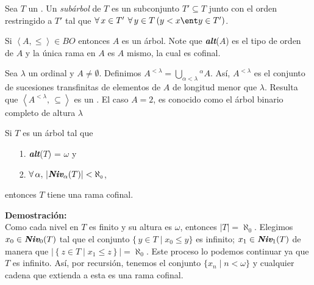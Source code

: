 \begin{definicion}
	Sea $T$ un \arbol. Un \textit{subárbol} de $T$ es un subconjunto $T'\subseteq T$ junto con el orden restringido a $T'$ tal que $\forall \, x\in T'\: \, \forall \, y\in T \left( y < x \ent y\in T'\right) $. 
\end{definicion} 


\begin{ejemplo}
	Si $\left\langle A, \leq \right\rangle \in BO$ entonces $A$ es un árbol. Note que \textit{\textbf{alt}}($A$) es el tipo de orden de $A$ y la única rama en $A$ es $A$ mismo, la cual es cofinal.  
\end{ejemplo} 

\begin{ejemplo}
	Sea $\lambda$ un ordinal y $A \neq \emptyset$. Definimos $A^{<\lambda} = \displaystyle \bigcup_{\alpha < \lambda} {^\alpha}A$. Así, $A^{<\lambda}$ es el conjunto de sucesiones transfinitas de elementos de $A$ de longitud menor que $\lambda$. Resulta que $\left\langle A^{<\lambda},\, \scriptstyle \subseteq \right\rangle$ es un \arbol. El caso $A = 2$, es conocido como el árbol binario completo de altura $\lambda$
\end{ejemplo}

\begin{teorema}
	Si $T$ es un árbol tal que
	\begin{itemize}
		\item[1.] \textit{\textbf{alt}}($T$) = $\omega$ y
		\item[2.] $\forall \, \alpha, \, |\textit{\textbf{Niv}}_{\alpha}(T)| < \aleph_{\scriptscriptstyle 0}$,
	\end{itemize}
	entonces $T$ tiene una rama cofinal. 	
\end{teorema}

\textbf{Demostración:}\\

Como cada nivel en $T$ es finito y su altura es $\omega$, entonces $|T| = \aleph_{\scriptscriptstyle 0}$. Elegimos $x_{0} \in \textit{\textbf{Niv}}_{0}(T)$ tal que el conjunto $\{ \,y\in T\mid x_{0} \leq y \}$ es infinito; $x_{1} \in \textit{\textbf{Niv}}_{1}(T)$ de manera que $|\left\lbrace z\in T \mid x_{1} \leq z \right\rbrace | = \aleph_{\scriptscriptstyle 0}$. Este proceso lo podemos continuar ya que $T$ es infinito. Así, por recursión, tenemos el conjunto $\{x_{n} \mid n < \omega\}$ y cualquier cadena que extienda a esta es una rama cofinal. \\

